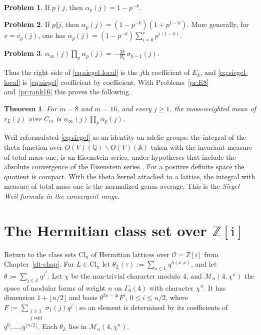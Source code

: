 \documentclass[reqno]{amsart}
\newcounter{chap}
\theoremstyle{definition}
\newtheorem{problem}{Problem}[section]
\theoremstyle{plain}
\newtheorem{theorem}{Theorem}[section]
\newcommand{\Z}{\mathbb{Z}}
\newcommand{\Q}{\mathbb{Q}}
\newcommand{\ii}{\mathrm{i}}
\newcommand{\Oc}{\mathcal{O}}
\newcommand{\Mf}{\mathcal{M}}
\newcommand{\Cl}{\mathrm{Cl}}
\begin{document}
\begin{problem}\label{pr:alpha-unit}
If \(p \nmid j\), then \(\alpha_p(j) = 1 - p^{-k}\).
\end{problem}

\begin{problem}\label{pr:alpha-p}
If \(p \Vert j\), then \(\alpha_p(j) = (1 - p^{-k})(1 + p^{1-k})\).  More generally, for \(v=v_p(j)\), one has \(\alpha_p(j)=(1-p^{-k})\sum_{i=0}^{v}p^{i(1-k)}\).
\end{problem}

\begin{problem}\label{pr:siegel-product}
\(\alpha_\infty(j)\prod_p \alpha_p(j) = -\frac{2k}{B_k}\,\sigma_{k-1}(j)\).
\end{problem}

Thus the right side of \eqref{eq:siegel-local} is the \(j\)th coefficient of \(E_k\), and \eqref{eq:siegel-local} is \eqref{eq:siegel} coefficient by coefficient.  With Problems~\ref{pr:E8} and~\ref{pr:rank16} this proves the following.

\begin{theorem}\label{thm:rank8-16}
For \(m = 8\) and \(m = 16\), and every \(j \ge 1\), the mass-weighted mean of \(r_L(j)\) over \(C_m\) is \(\alpha_\infty(j)\prod_p\alpha_p(j)\).
\end{theorem}

Weil reformulated \eqref{eq:siegel} as an identity on adelic groups: the integral of the theta function over \(O(V)(\Q)\backslash O(V)(\mathbb{A})\) taken with the invariant measure of total mass one, is an Eisenstein series, under hypotheses that include the absolute convergence of the Eisenstein series \cite[Theorem~5]{We65}.  For a positive definite space the quotient is compact.  With the theta kernel attached to a lattice, the integral with measure of total mass one is the normalized genus average.  This is the \emph{Siegel--Weil formula in the convergent range}.


\section{The Hermitian class set over \texorpdfstring{\(\Z[\ii]\)}{Z[i]}}\label{sec:hermitian}

Return to the class sets \(\Cl_n\) of Hermitian lattices over \(\Oc = \Z[\ii]\) from Chapter~\ref{dt-chap}.  For \(L \in \Cl_n\) let \(\theta_L(\tau) := \sum_{x \in L} q^{h(x,x)}\), and let \(\theta := \sum_{j \in \Z} q^{j^2}\).  Let \(\chi\) be the non-trivial character modulo \(4\), and \(\Mf_n(4,\chi^n)\) the space of modular forms of weight \(n\) on \(\Gamma_0(4)\) with character \(\chi^n\).  It has dimension \(1 + \lfloor n/2\rfloor\) and basis \(\theta^{2n-4i}F^i\), \(0 \le i \le n/2\), where \(F := \sum_{\substack{j\ge1\\j \text{ odd}}}\sigma_1(j)q^j\) \cite[Ch.~IV, \S1]{Ko}; so an element is determined by its coefficients of \(q^0, \dots, q^{\lfloor n/2\rfloor}\).  Each \(\theta_L\) lies in \(\Mf_n(4,\chi^n)\).
\end{document}
